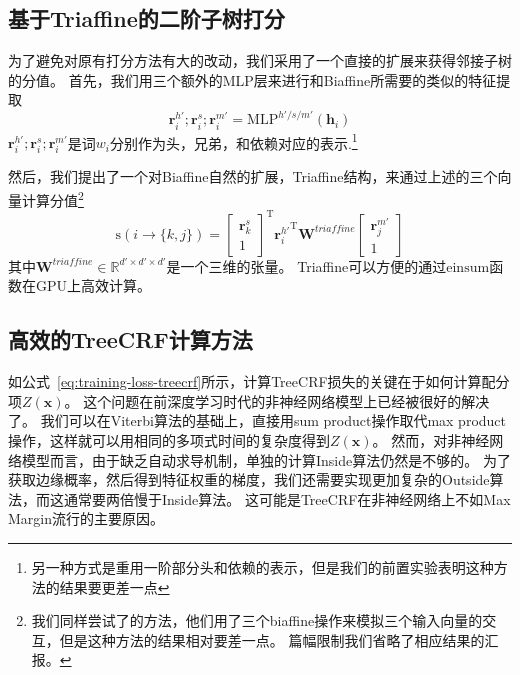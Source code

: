 \subsection{基于Triaffine的二阶子树打分}
为了避免对原有打分方法有大的改动，我们采用了一个直接的扩展来获得邻接子树的分值。
首先，我们用三个额外的MLP层来进行和Biaffine所需要的类似的特征提取
\begin{equation}
	\label{mlp-sib}
	\mathbf{r}_i^{h'}; \mathbf{r}_i^{s}; \mathbf{r}_i^{m'} =\mathrm{MLP}^{h'/s/m'} \left( \mathbf{h}_i \right)
\end{equation}
$\mathbf{r}_i^{h'}; \mathbf{r}_i^{s}; \mathbf{r}_i^{m'}$是词$w_i$分别作为头，兄弟，和依赖对应的表示.\footnote{
	另一种方式是重用一阶部分头和依赖的表示，但是我们的前置实验表明这种方法的结果要更差一点
}

然后，我们提出了一个对Biaffine自然的扩展，Triaffine结构，来通过上述的三个向量计算分值\footnote{
	我们同样尝试了\citet{wang-etal-2019-second}的方法，他们用了三个biaffine操作来模拟三个输入向量的交互，但是这种方法的结果相对要差一点。
	篇幅限制我们省略了相应结果的汇报。
}
\begin{equation} \label{eq:triaffine}
	\mathrm{s}(i\rightarrow \{k,j\}) =
	\left[
		\begin{array}{c}
			\mathbf{r}_{k}^{s} \\
			1                  
		\end{array}
	\right]^\mathrm{T}
	{\mathbf{r}_{i}^{h'}}^\mathrm{T}
	\mathbf{W}^\textit{triaffine}
	\left[
		\begin{array}{c}
			\mathbf{r}_{j}^{m'} \\
			1                   
		\end{array}
	\right]
\end{equation}
其中$\mathbf{W}^\textit{triaffine} \in \mathbb{R}^{d' \times d' \times d'}$是一个三维的张量。
Triaffine可以方便的通过$\mathrm{einsum}$函数在GPU上高效计算。

\subsection{高效的TreeCRF计算方法}

如公式~\ref{eq:training-loss-treecrf}所示，计算TreeCRF损失的关键在于如何计算配分项$Z(\boldsymbol{x})$。
这个问题在前深度学习时代的非神经网络模型上已经被很好的解决了。
我们可以在Viterbi算法的基础上，直接用sum product操作取代max product操作，这样就可以用相同的多项式时间的复杂度得到$Z(\boldsymbol{x})$。
然而，对非神经网络模型而言，由于缺乏自动求导机制，单独的计算Inside算法仍然是不够的。
为了获取边缘概率，然后得到特征权重的梯度，我们还需要实现更加复杂的Outside算法，而这通常要两倍慢于Inside算法。
这可能是TreeCRF在非神经网络上不如Max Margin流行的主要原因。

